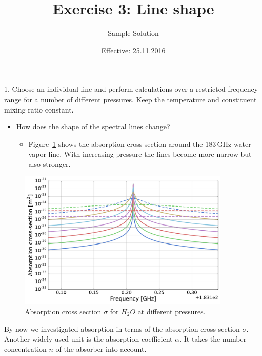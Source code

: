 \documentclass[paper=a4, fontsize=11pt]{scrartcl} %
\title{Exercise 3: Line shape}
\author{Sample Solution}
\date{Effective: 25.11.2016}
\begin{document}
\maketitle

1. Choose an individual line and perform calculations over a restricted 
frequency range for a number of different pressures. Keep the temperature and 
constituent mixing ratio constant.

\begin{itemize}
  \item How does the shape of the spectral lines change?
    \begin{itemize}
      \item Figure~\ref{fig:abs_xsec} shows the absorption cross-section around 
      the 183\,GHz water-vapor line. With increasing pressure the lines become
      more narrow but also stronger.
    \end{itemize}
\end{itemize}
\vfill
\begin{figure}[h!]
  \centering
  \includegraphics[width=0.9\textwidth]{plots/line_center_crosssection.pdf}
  \caption{Absorption cross section $\sigma$ for $H_2O$ at different pressures.}
  \label{fig:abs_xsec}
\end{figure}

\clearpage
By now we investigated absorption in terms of the absorption cross-section 
$\sigma$. Another widely used unit is the absorption coefficient $\alpha$. It 
takes the number concentration $n$ of the absorber into account.
\end{document}
